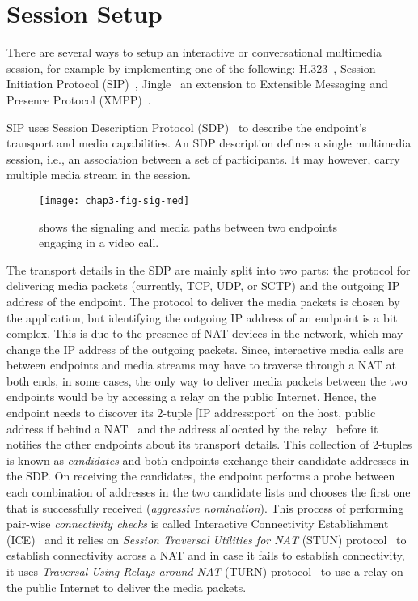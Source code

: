 \section{Session Setup}


There are several ways to setup an interactive or conversational multimedia
session, for example by implementing one of the following:
H.323~\cite{H.323}, Session Initiation Protocol (SIP)~\cite{rfc3261},
Jingle~\cite{XEP-0166} an extension to Extensible Messaging and Presence
Protocol (XMPP)~\cite{rfc6120}. 

SIP uses Session Description Protocol (SDP)~\cite{rfc4566} to describe the
endpoint's transport and media capabilities. An SDP description defines a
single multimedia session, i.e., an association between a set of participants.
It may however, carry multiple media stream in the session.

\begin{figure}[!h]
\centerline{\texttt{[image: chap3-fig-sig-med]}}
\caption{shows the signaling and media paths between two endpoints engaging in
a video call.}
\label{fig:3:sig.media}
\end{figure}


The transport details in the SDP are mainly split into two parts: the protocol
for delivering media packets (currently, TCP, UDP, or SCTP) and the outgoing
IP address of the endpoint. The protocol to deliver the media packets is
chosen by the application, but identifying the outgoing IP address of an
endpoint is a bit complex. This is due to the presence of NAT devices in the
network, which may change the IP address of the outgoing packets. Since,
interactive media calls are between endpoints and media streams may have to
traverse through a NAT at both ends, in some cases, the only way to deliver
media packets between the two endpoints would be by accessing a relay on the
public Internet. Hence, the endpoint needs to discover its 2-tuple [IP
address:port] on the host, public address if behind a NAT~\cite{rfc5389} and
the address allocated by the relay~\cite{rfc5766} before it notifies the other
endpoints about its transport details. This collection of 2-tuples is known as
\emph{candidates} and both endpoints exchange their candidate addresses in the
SDP. On receiving the candidates, the endpoint performs a probe between each
combination of addresses in the two candidate lists and chooses the first one
that is successfully received (\emph{aggressive nomination}). This process of
performing pair-wise \emph{connectivity checks} is called Interactive
Connectivity Establishment (ICE)~\cite{rfc5245, rfc6544} and it relies on
\emph{Session Traversal Utilities for NAT} (STUN) protocol~\cite{rfc5389} to
establish connectivity across a NAT and in case it fails to establish
connectivity, it uses \emph{Traversal Using Relays around NAT} (TURN)
protocol~\cite{rfc5766} to use a relay on the public Internet to deliver the
media packets.

